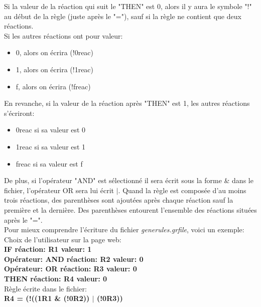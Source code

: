 Si la valeur de la réaction qui suit le "THEN" est 0, alors il y aura le symbole "!" au début de la règle (juste après le "="), sauf si la règle ne contient que deux réactions.\\
Si les autres réactions ont pour valeur:
\begin{itemize}
\item 0, alors on écrira (!0reac)
\item 1, alors on écrira (!1reac)
\item f, alors on écrira (!freac)
\end{itemize}
En revanche, si la valeur de la réaction après "THEN" est 1, les autres réactions s'écriront:
\begin{itemize}
\item 0reac si sa valeur est 0
\item 1reac si sa valeur est 1
\item freac si sa valeur est f
\end{itemize}
De plus, si l'opérateur "AND" est sélectionné il sera écrit sous la forme \& dans le fichier, l'opérateur OR sera lui écrit $|$. Quand la règle est composée d'au moins trois réactions, des parenthèses sont ajoutées après chaque réaction sauf la première et la dernière. Des parenthèses entourent l'ensemble des réactions situées après le "=".\\

Pour mieux comprendre l'écriture du fichier \emph{generules.grfile}, voici un exemple:\\
Choix de l'utilisateur sur la page web:\\
\textbf{IF réaction: R1 valeur: 1\\
Opérateur: AND réaction: R2 valeur: 0\\
Opérateur: OR réaction: R3 valeur: 0\\
THEN réaction: R4 valeur: 0}\\

Règle écrite dans le fichier: \\
\textbf{R4 = (!((1R1 \& (!0R2)) $|$ (!0R3))}

